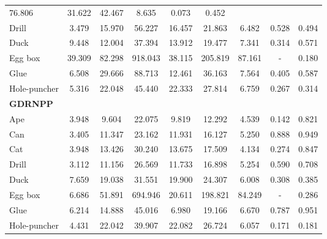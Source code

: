 \documentclass[11pt]{article}
\begin{document}
\begin{table}[htbp]
{\begin{tabular}{l|ccc|ccc|cc}
      76.806 &
      31.622 &
      42.467 &
      8.635 &
      0.073 &
      0.452 \\ 
    \hspace{10px} Drill &
      3.479 &
      15.970 &
      56.227 &
      16.457 &
      21.863 &
      6.482 &
      0.528 &
      0.494 \\ 
    \hspace{10px} Duck &
      9.448 &
      12.004 &
      37.394 &
      13.912 &
      19.477 &
      7.341 &
      0.314 &
      0.571 \\ 
    \hspace{10px} Egg box &
      39.309 &
      82.298 &
      918.043 &
      38.115 &
      205.819 &
      87.161 &
      - &
      0.180 \\ 
    \hspace{10px} Glue &
      6.508 &
      29.666 &
      88.713 &
      12.461 &
      36.163 &
      7.564 &
      0.405 &
      0.587 \\ 
    \hspace{10px} Hole-puncher &
      5.316 &
      22.048 &
      45.440 &
      22.333 &
      27.814 &
      6.759 &
      0.267 &
      0.314 \\ \hline

    \textbf{GDRNPP}  &&&&&&&& \\
    \hspace{10px} Ape &
      3.948 &
      9.604 &
      22.075 &
      9.819 &
      12.292 &
      4.539 &
      0.142 &
      0.821 \\ 
    \hspace{10px} Can &
      3.405 &
      11.347 &
      23.162 &
      11.931 &
      16.127 &
      5.250 &
      0.888 &
      0.949 \\ 
    \hspace{10px} Cat &
      3.948 &
      13.426 &
      30.240 &
      13.675 &
      17.509 &
      4.134 &
      0.274 &
      0.847 \\ 
    \hspace{10px} Drill &
      3.112 &
      11.156 &
      26.569 &
      11.733 &
      16.898 &
      5.254 &
      0.590 &
      0.708 \\ 
    \hspace{10px} Duck &
      7.659 &
      19.038 &
      31.551 &
      19.900 &
      24.307 &
      6.008 &
      0.308 &
      0.385 \\ 
    \hspace{10px} Egg box &
      6.686 &
      51.891 &
      694.946 &
      20.611 &
      198.821 &
      84.249 &
      - &
      0.286 \\ 
    \hspace{10px} Glue &
      6.214 &
      14.888 &
      45.016 &
      6.980 &
      19.166 &
      6.670 &
      0.787 &
      0.951 \\ 
    \hspace{10px} Hole-puncher &
      4.431 &
      22.042 &
      39.907 &
      22.082 &
      26.724 &
      6.057 &
      0.171 &
      0.181 \\ \hline


\end{tabular}}
\end{table}
\end{document}
